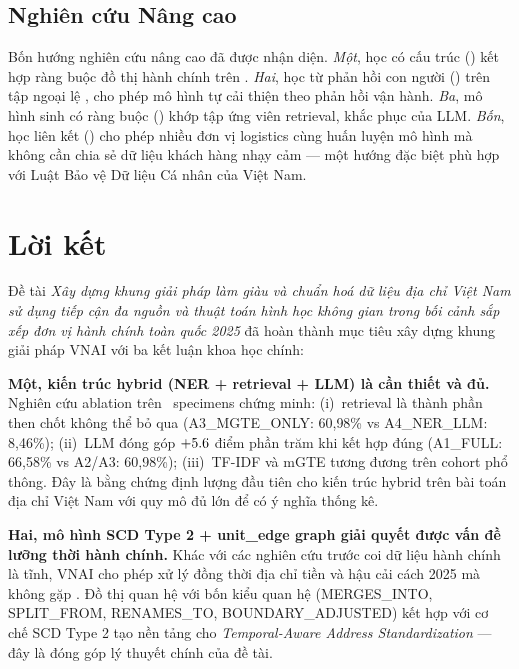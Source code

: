 \subsection{Nghiên cứu Nâng cao}
\label{sec:concl-h6}

Bốn hướng nghiên cứu nâng cao đã được nhận diện. \emph{Một}, học có cấu trúc () kết hợp ràng buộc đồ thị hành chính trên . \emph{Hai}, học từ phản hồi con người () trên tập ngoại lệ , cho phép mô hình tự cải thiện theo phản hồi vận hành. \emph{Ba}, mô hình sinh có ràng buộc () khớp tập ứng viên retrieval, khắc phục  của LLM. \emph{Bốn}, học liên kết () cho phép nhiều đơn vị logistics cùng huấn luyện mô hình mà không cần chia sẻ dữ liệu khách hàng nhạy cảm --- một hướng đặc biệt phù hợp với Luật Bảo vệ Dữ liệu Cá nhân của Việt Nam.

\section{Lời kết}
\label{sec:concl-final}

Đề tài \emph{Xây dựng khung giải pháp làm giàu và chuẩn hoá dữ liệu địa chỉ Việt Nam sử dụng tiếp cận đa nguồn và thuật toán hình học không gian trong bối cảnh sắp xếp đơn vị hành chính toàn quốc 2025} đã hoàn thành mục tiêu xây dựng khung giải pháp VNAI với ba kết luận khoa học chính:

\textbf{Một, kiến trúc hybrid (NER + retrieval + LLM) là cần thiết và đủ.} Nghiên cứu ablation trên \VNAIABLATIONTotalSpecimens\, specimens chứng minh: (i)~retrieval là thành phần then chốt không thể bỏ qua (A3\_MGTE\_ONLY: 60{,}98\% vs A4\_NER\_LLM: 8{,}46\%); (ii)~LLM đóng góp \(+5.6\) điểm phần trăm khi kết hợp đúng (A1\_FULL: 66{,}58\% vs A2/A3: 60{,}98\%); (iii)~TF-IDF và mGTE tương đương trên cohort phổ thông. Đây là bằng chứng định lượng đầu tiên cho kiến trúc hybrid trên bài toán địa chỉ Việt Nam với quy mô đủ lớn để có ý nghĩa thống kê.

\textbf{Hai, mô hình SCD Type 2 + unit\_edge graph giải quyết được vấn đề lưỡng thời hành chính.} Khác với các nghiên cứu trước coi dữ liệu hành chính là tĩnh, VNAI cho phép xử lý đồng thời địa chỉ tiền và hậu cải cách 2025 mà không gặp . Đồ thị quan hệ  với bốn kiểu quan hệ (MERGES\_INTO, SPLIT\_FROM, RENAMES\_TO, BOUNDARY\_ADJUSTED) kết hợp với cơ chế SCD Type 2 tạo nền tảng cho \emph{Temporal-Aware Address Standardization} --- đây là đóng góp lý thuyết chính của đề tài.


